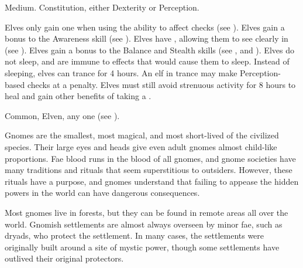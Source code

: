    Medium.
    Constitution, either  Dexterity or  Perception.
  \begin{raggeditemize}
     Elves only gain one  when using the  ability to affect checks (see ).
     Elves gain a  bonus to the Awareness skill (see ).
     Elves have , allowing them to see clearly in  (see ).
     Elves gain a  bonus to the Balance and Stealth skills (see , and ).
     Elves do not sleep, and are immune to \magical effects that would cause them to sleep.
      Instead of sleeping, elves can trance for 4 hours.
      An elf in trance may make Perception-based checks at a  penalty.
      Elves must still avoid strenuous activity for 8 hours to heal and gain other benefits of taking a .
  \end{raggeditemize}
   Common, Elven, any one  (see ).


  Gnomes are the smallest, most magical, and most short-lived of the civilized species.
  Their large eyes and heads give even adult gnomes almost child-like proportions.
  Fae blood runs in the blood of all gnomes, and gnome societies have many traditions and rituals that seem superstitious to outsiders.
  However, these rituals have a purpose, and gnomes understand that failing to appease the hidden powers in the world can have dangerous consequences.

  Most gnomes live in forests, but they can be found in remote areas all over the world.
  Gnomish settlements are almost always overseen by minor fae, such as dryads, who protect the settlement.
  In many cases, the settlements were originally built around a site of mystic power, though some settlements have outlived their original protectors.

